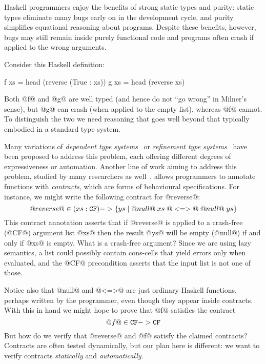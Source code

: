 Haskell programmers enjoy the benefits of strong static types and purity: 
static types eliminate many bugs early on in the development cycle, and purity 
simplifies equational reasoning about programs. Despite these benefits, however, 
bugs may still remain inside purely functional code and programs often
crash if applied to the wrong arguments. 

Consider this Haskell definition:
\begin{code}
  f xs = head (reverse (True : xs))
  g xs = head (reverse xs)
\end{code}
Both @f@ and @g@ are well typed (and hence do not ``go wrong'' in Milner's 
sense), but @g@ can crash (when applied to the empty list), whereas @f@ cannot.
To distinguish the two we need reasoning that goes well beyond 
that typically embodied in a standard type system.

Many variations of {\em dependent type systems}~\cite{norell:thesis,Xi:2007:DMA:1230756.1230759,fstar} or 
{\em refinement type systems}~\cite{Rondon:2008:LT:1375581.1375602,Knowles+:sage}
have been proposed to address this problem, each offering different degrees of 
expressiveness or automation. 
Another line of work aiming to address this problem, studied by many researchers
as well~\cite{Findler:2002:CHF:581478.581484,Blume:2006:SCM:1166013.1166016,Knowles+:sage,Siek06gradualtyping,Wadler:2009:WPC:1532974.1532976}, allows programmers to annotate 
functions with {\em contracts}, which are forms of behavioural specifications.
For instance, we might write the following contract for 
@reverse@: 
\[ @reverse@ \in (xs : {\tt CF}) -> \{ ys \mid @null@\;xs\; @<=>@\; @null@\;ys \}  \] 
This contract annotation asserts that if @reverse@ is applied to a 
crash-free (@CF@) argument list @xs@ then the result @ys@ will be empty (@null@) 
if and only if @xs@ is empty. What is a crash-free argument? 
Since we are using lazy semantics, a list could possibly contain cons-cells that yield 
errors only when evaluated, and the @CF@ precondition asserts that the input list 
is not one of those.

Notice also that @null@ and @<=>@ are just ordinary Haskell functions, perhaps
written by the programmer, even though they appear inside contracts.
With this in hand we might hope to prove that @f@ satisfies the contract
\[ @f@ \in {\tt CF} -> {\tt CF} \] 
But how do we verify that @reverse@ and @f@ satisfy the claimed
contracts? Contracts are often tested dynamically, but 
our plan here is different: we want to verify contracts \emph{statically} 
and \emph{automatically}. 

